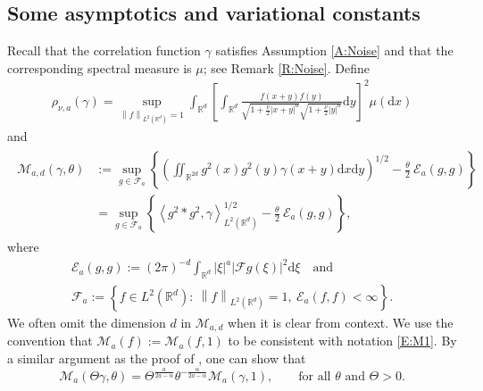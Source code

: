 \documentclass[a4paper,11pt]{article}
\numberwithin{equation}{section}
\numberwithin{equation}{section}
\theoremstyle{plain}
\theoremstyle{definition}
\newcommand{\ud}{\ensuremath{\mathrm{d} }}
\newcommand{\Norm}[1]{\left\|  #1   \right\|}
\newcommand{\R}{\mathbb{R}}
\begin{document}
\subsection{Some asymptotics and variational constants} \label{SS:Variation}

Recall that the correlation function $\gamma$ satisfies Assumption \ref{A:Noise} and that the
corresponding spectral measure is $\mu$; see Remark \ref{R:Noise}. Define
\begin{gather} \label{E:rho}
  \rho_{\nu,a}(\gamma) = \sup_{\Norm{f}_{L^2(\R^d)} =1} \int_{\R^d} \left[ \int_{\R^d} \frac{f(x+y)f(y)}{\sqrt{1+\frac{\nu}{2}|x+y|^a } \sqrt{1+\frac{\nu}{2}|y|^a} } \ud y \right]^2 \mu(\ud x)
\end{gather}
and
\begin{gather} \label{E:Lambda}
  \begin{aligned}
    \mathcal{M}_{a,d}(\gamma,\theta)
    & := \sup_{g \in \mathcal{F}_a} \left\{ \left( \iint_{\R^{2d}} g^2(x)g^2(y) \gamma(x+y)\ud x\ud y \right)^{1/2} - \frac{\theta}{2}\: \mathcal{E}_a(g,g) \right\} \\
    & = \sup_{g \in \mathcal{F}_a} \left\{ \left\langle g^2 * g^2, \gamma \right\rangle_{L^2(\R^d)}^{1/2} - \frac{\theta}{2}\: \mathcal{E}_a(g,g) \right\},
  \end{aligned}
\end{gather}
where
\begin{gather} \label{E:Egg}
  \mathcal{E}_a(g,g) := (2\pi)^{-d} \int_{\R^d} |\xi|^a |\mathcal{F}g(\xi)|^2 \ud \xi \quad \text{and} \\
  \mathcal{F}_a      := \left\{f\in L^2(\R^d): \: \Norm{f}_{L^2(\R^d)}=1,\: \mathcal{E}_a(f,f)<\infty \right\}.
  \label{E:Fa}
\end{gather}
We often omit the dimension $d$ in  $ \mathcal{M}_{a,d}$ when it is clear from context.  We use the
convention that $\mathcal{M}_a(f):=\mathcal{M}_a(f,1)$ to be consistent with notation \eqref{E:M1}.
By a similar argument as the proof of \cite[Lemma 2.3]{BCC21}, one can show that
\begin{equation} \label{E:ScaleM}
  \mathcal{M}_a(\Theta \gamma , \theta) =
  \Theta^{\frac{a}{2a-\alpha}}\theta^{-\frac{\alpha}{2a-\alpha}} \mathcal{M}_a( \gamma , 1),
  \qquad \text{for all $\theta$ and $\Theta>0 $.}
\end{equation}
\end{document}
